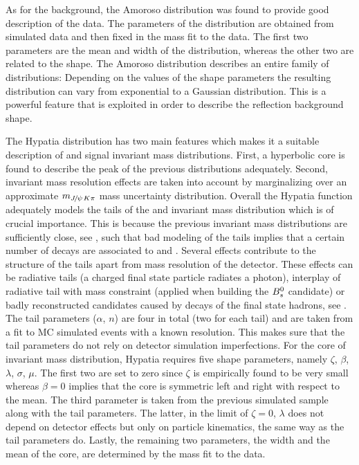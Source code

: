 As for the \LbJpsippi background, the Amoroso distribution was found to provide  good description of the data.
The parameters of the distribution are obtained from simulated data and then fixed in the mass fit to the data. The first two parameters
are the mean and width of the distribution, whereas the other two are related to the shape. The Amoroso distribution describes
an entire family of distributions: Depending on the values of the shape parameters the resulting distribution can vary from exponential
to a Gaussian distribution. This is a powerful feature that is exploited in order to describe the \LbJpsippi reflection background shape.

The Hypatia distribution has two main features which makes it a suitable description of \Bs and \Bd signal invariant mass distributions.
First, a hyperbolic core is found to describe the peak of the previous distributions adequately. Second, invariant mass resolution
effects are taken into account by marginalizing over an approximate $m_{{J\mskip -3mu/\mskip -2mu\psi\mskip 2mu} K\pi}$ mass uncertainty distribution. Overall the Hypatia function adequately
models the tails of the \Bs and \Bd invariant mass distribution which is of crucial importance. This is because the previous invariant
mass distributions are sufficiently close, see , such that bad modeling of the tails implies that a certain number of \Bd decays
are associated to \Bs and \viceversa. Several effects contribute to the structure of the tails apart
from mass resolution of the detector. These effects can be radiative tails (a charged final state particle radiates a photon), interplay of
radiative tail with \jpsi mass constraint (applied when building the $B^0_s$ candidate) or badly reconstructed candidates caused by decays of the final state hadrons, see \cite{Santos:2013gra}.
The tail parameters ($\alpha$, $n$) are four in total (two for each tail) and are taken from a fit to MC simulated events with a known resolution.
This makes sure that the tail parameters do not rely on detector simulation imperfections.
For the core of invariant mass distribution, Hypatia requires five shape parameters, namely $\zeta$, $\beta$, $\lambda$, $\sigma$, $\mu$.
The first two are set to zero since $\zeta$ is empirically found to be very small whereas $\beta = 0$ implies that the core is
symmetric left and right with respect to the mean. The third parameter is taken from the previous simulated sample along
with the tail parameters. The latter, in the limit of $\zeta = 0$, $\lambda$ does not depend on detector effects but only
on particle kinematics, the same way as the tail parameters do. Lastly, the remaining two parameters, the width and
the mean of the core, are determined by the mass fit to the data.


